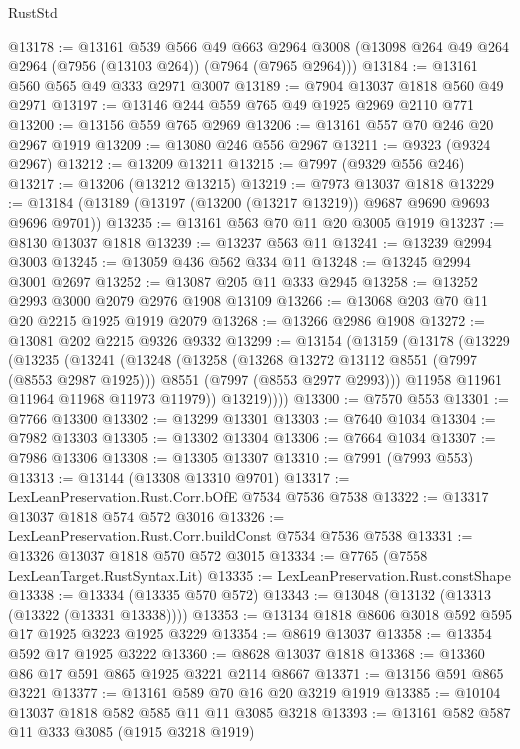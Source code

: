 \begin{lexlean}{RustStd}
\begin{coremodule}
@13178 := @13161
    @539
    @566
    @49
    @663
    @2964
    @3008
    (@13098 @264 @49 @264 @2964 (@7956 (@13103 @264)) (@7964 (@7965 @2964)))
@13184 := @13161 @560 @565 @49 @333 @2971 @3007
@13189 := @7904 @13037 @1818 @560 @49 @2971
@13197 := @13146 @244 @559 @765 @49 @1925 @2969 @2110 @771
@13200 := @13156 @559 @765 @2969
@13206 := @13161 @557 @70 @246 @20 @2967 @1919
@13209 := @13080 @246 @556 @2967
@13211 := @9323 (@9324 @2967)
@13212 := @13209 @13211
@13215 := @7997 (@9329 @556 @246)
@13217 := @13206 (@13212 @13215)
@13219 := @7973 @13037 @1818
@13229 := @13184 (@13189 (@13197 (@13200 (@13217 @13219)) @9687 @9690 @9693 @9696 @9701))
@13235 := @13161 @563 @70 @11 @20 @3005 @1919
@13237 := @8130 @13037 @1818
@13239 := @13237 @563 @11
@13241 := @13239 @2994 @3003
@13245 := @13059 @436 @562 @334 @11
@13248 := @13245 @2994 @3001 @2697
@13252 := @13087 @205 @11 @333 @2945
@13258 := @13252 @2993 @3000 @2079 @2976 @1908 @13109
@13266 := @13068 @203 @70 @11 @20 @2215 @1925 @1919 @2079
@13268 := @13266 @2986 @1908
@13272 := @13081 @202 @2215 @9326 @9332
@13299 := @13154
    (@13159
      (@13178
        (@13229
          (@13235
            (@13241
              (@13248
                (@13258
                  (@13268 @13272 @13112 @8551 (@7997 (@8553 @2987 @1925)))
                  @8551
                  (@7997 (@8553 @2977 @2993)))
                @11958
                @11961
                @11964
                @11968
                @11973
                @11979))
            @13219))))
@13300 := @7570 @553
@13301 := @7766 @13300
@13302 := @13299 @13301
@13303 := @7640 @1034
@13304 := @7982 @13303
@13305 := @13302 @13304
@13306 := @7664 @1034
@13307 := @7986 @13306
@13308 := @13305 @13307
@13310 := @7991 (@7993 @553)
@13313 := @13144 (@13308 @13310 @9701)
@13317 := LexLeanPreservation.Rust.Corr.bOfE @7534 @7536 @7538
@13322 := @13317 @13037 @1818 @574 @572 @3016
@13326 := LexLeanPreservation.Rust.Corr.buildConst @7534 @7536 @7538
@13331 := @13326 @13037 @1818 @570 @572 @3015
@13334 := @7765 (@7558 LexLeanTarget.RustSyntax.Lit)
@13335 := LexLeanPreservation.Rust.constShape
@13338 := @13334 (@13335 @570 @572)
@13343 := @13048 (@13132 (@13313 (@13322 (@13331 @13338))))
@13353 := @13134 @1818 @8606 @3018 @592 @595 @17 @1925 @3223 @1925 @3229
@13354 := @8619 @13037
@13358 := @13354 @592 @17 @1925 @3222
@13360 := @8628 @13037 @1818
@13368 := @13360 @86 @17 @591 @865 @1925 @3221 @2114 @8667
@13371 := @13156 @591 @865 @3221
@13377 := @13161 @589 @70 @16 @20 @3219 @1919
@13385 := @10104 @13037 @1818 @582 @585 @11 @11 @3085 @3218
@13393 := @13161 @582 @587 @11 @333 @3085 (@1915 @3218 @1919)

\end{coremodule}
\end{lexlean}
